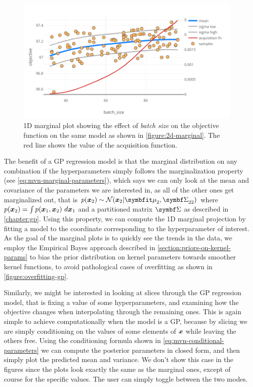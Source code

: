 \begin{figure}
	\begin{center}
		\includegraphics[width=1.0\textwidth]{images/1d-marginal.png}
		\caption{1D marginal plot showing the effect of \emph{batch size} on the objective function on the same model as shown in \autoref{figure:2d-marginal}. The red line shows the value of the acquisition function.}
	\end{center}
\end{figure}
\label{figure:1d-marginal}

The benefit of a GP regression model is that the marginal distribution on any combination if the hyperparameters simply follows the marginalization property (see \autoref{eq:mvn-marginal-parameters}), which says we can only look at the mean and covariance of the parameters we are interested in, as all of the other ones get marginalized out, that is $p(\vx_2) \sim \mathcal{N}(\vx_2 | \vmu_2, \mSigma_{22})$ where $p({\boldsymbol{x}}_2) = \int p({\boldsymbol{x}}_1, {\boldsymbol{x}}_2)\ d{\boldsymbol{x}}_1$ and a partitioned matrix $\mSigma$ as described in \autoref{chapter:gp}. Using this property, we can compute the 1D marginal projection by fitting a model to the coordinate corresponding to the hyperparameter of interest. As the goal of the marginal plots is to quickly see the trends in the data, we employ the Empirical Bayes approach described in \autoref{section:priors-on-kernel-params} to bias the prior distribution on kernel parameters towards smoother kernel functions, to avoid pathological cases of overfitting as shown in \autoref{figure:overfitting-gp}.

Similarly, we might be interested in looking at slices through the GP regression model, that is fixing a value of some hyperparameters, and examining how the objective changes when interpolating through the remaining ones. This is again simple to achieve computationally when the model is a GP, because by slicing we are simply conditioning on the values of some elements of ${\boldsymbol{x}}$ while leaving the others free. Using the conditioning formula shown in \autoref{eq:mvn-conditional-parameters} we can compute the posterior parameters in closed form, and then simply plot the predicted mean and variance. We don't show this case in the figures since the plots look exactly the same as the marginal ones, except of course for the specific values. The user can simply toggle between the two modes.

